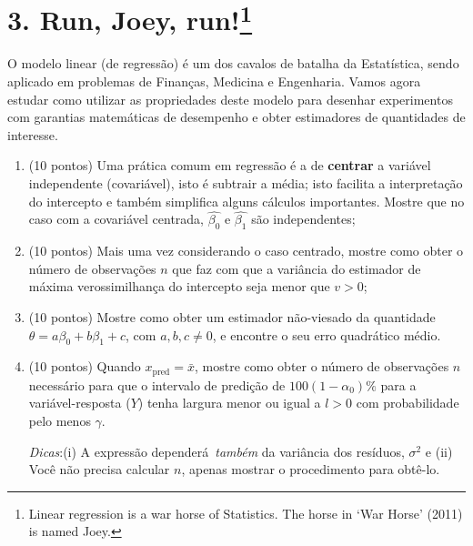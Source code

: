\documentclass[a4paper,10pt, notitlepage]{report}
\newif\ifanswers
\begin{document}
\section*{3. Run, Joey, run!\footnote{Linear regression is a war horse of Statistics. The horse in `War Horse' (2011) is named Joey.}}

O modelo linear (de regressão) é um dos cavalos de batalha da Estatística, sendo aplicado em problemas de Finanças, Medicina e Engenharia.
Vamos agora estudar como utilizar as propriedades deste modelo para desenhar experimentos com garantias matemáticas de desempenho e obter estimadores de quantidades de interesse.

\begin{enumerate}[label=\alph*)]
 \item (10 pontos) Uma prática comum em regressão é a de \textbf{centrar} a variável independente (covariável), isto é subtrair a média; isto facilita a interpretação do intercepto e também simplifica alguns cálculos importantes.
 Mostre que no caso com a covariável centrada, $\hat{\beta_0}$ e $\hat{\beta_1}$ são independentes;
 \item (10 pontos) Mais uma vez considerando o caso centrado, mostre 
 como obter o número de observações $n$ que faz com que a variância do estimador de máxima verossimilhança do intercepto seja menor que $v > 0$;
 \item (10 pontos) Mostre como obter um estimador não-viesado da quantidade $\theta = a\beta_0 + b\beta_1 + c$, com $a, b, c \neq 0$, e encontre o seu erro quadrático médio.
 \item (10 pontos)  Quando $x_{\text{pred}} = \bar{x}$, mostre como obter  o número de observações $n$ necessário para que o intervalo de predição de $100(1-\alpha_0)\%$ para a variável-resposta ($Y$) tenha largura menor ou igual a $l>0$ com probabilidade pelo menos $\gamma$.
 
 \textit{Dicas}:(i) A expressão dependerá~\textit{também} da variância dos resíduos, $\sigma^2$ e (ii) Você não precisa calcular $n$, apenas mostrar o procedimento para obtê-lo.
 \end{enumerate}


\ifanswers

\fi

% 
% 
\end{document}

